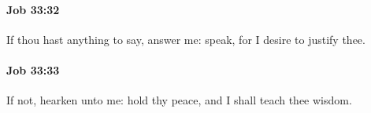 		\paragraph{Job 33:32} %
			\label{JOB-33-32}

			If thou hast anything to say, answer me: speak, for I desire to justify thee.


		\paragraph{Job 33:33} %
			\label{JOB-33-33}

			If not, hearken unto me: hold thy peace, and I shall teach thee wisdom.

